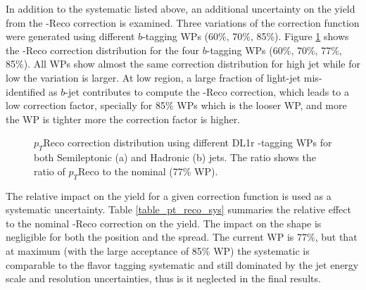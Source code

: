In addition to the systematic listed above, an additional uncertainty on the yield from the \pT-Reco correction is examined. Three variations of the correction function were generated using different $b$-tagging WPs (60\%, 70\%, 85\%). Figure \ref{fig:HHyybb:Sys:Exp:PtReco} shows the \pT-Reco correction distribution for the four $b$-tagging WPs (60\%, 70\%, 77\%, 85\%). All WPs show almost the same correction distribution for high \pT jet while for low \pT the variation is larger. At low \pT region, a large fraction of light-jet mis-identified as $b$-jet contributes to compute the \pT-Reco correction, which leads to a low correction factor, specially for 85\% WPs which is the looser WP, and more the WP is tighter more the correction factor is higher.\\
\begin{figure}[htbp]
   \centering
   \quad
   \begin{tcolorbox}[colback=black!5!white,colframe=white!75!black]
   \caption{$p_T$Reco correction distribution using different DL1r \bq-tagging WPs for both Semileptonic (a) and Hadronic (b) jets. The ratio shows the ratio of $p_T$Reco to the nominal (77\% WP). }
   \label{fig:HHyybb:Sys:Exp:PtReco}
   \end{tcolorbox}
   
\end{figure}
The relative impact on the yield for a given correction function is used as a systematic uncertainty. Table \ref{table_pt_reco_sys} summaries the relative effect to the nominal \pT-Reco correction on the yield. The impact on the shape is negligible for both the position and the spread. The current WP is 77\%, but that at maximum (with the large acceptance of 85\% WP) the systematic is comparable to the flavor tagging systematic and still dominated by the jet energy scale and resolution uncertainties, thus is it neglected in the final results. 
